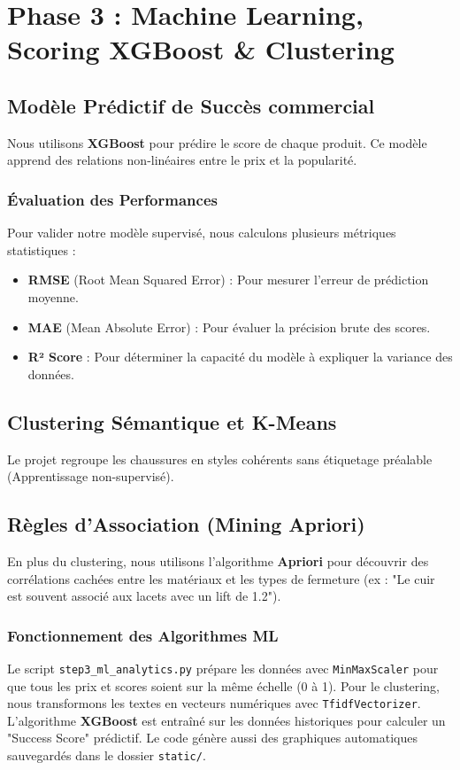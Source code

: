\documentclass[11pt,a4paper,oneside]{report}
\begin{document}
    \chapter{Phase 3 : Machine Learning, Scoring XGBoost \& Clustering}
    \section{Modèle Prédictif de Succès commercial}
    Nous utilisons \textbf{XGBoost} pour prédire le score de chaque produit. Ce modèle apprend des relations non-linéaires entre le prix et la popularité.

    \subsection{Évaluation des Performances}
    Pour valider notre modèle supervisé, nous calculons plusieurs métriques statistiques :
    \begin{itemize}
        \item \textbf{RMSE} (Root Mean Squared Error) : Pour mesurer l'erreur de prédiction moyenne.
        \item \textbf{MAE} (Mean Absolute Error) : Pour évaluer la précision brute des scores.
        \item \textbf{R² Score} : Pour déterminer la capacité du modèle à expliquer la variance des données.
    \end{itemize}

    \section{Clustering Sémantique et K-Means}
    Le projet regroupe les chaussures en styles cohérents sans étiquetage préalable (Apprentissage non-supervisé).

    \section{Règles d'Association (Mining Apriori)}
    En plus du clustering, nous utilisons l'algorithme \textbf{Apriori} pour découvrir des corrélations cachées entre les matériaux et les types de fermeture (ex : "Le cuir est souvent associé aux lacets avec un lift de 1.2").

    \subsection{Fonctionnement des Algorithmes ML}
    Le script \texttt{step3\_ml\_analytics.py} prépare les données avec \texttt{MinMaxScaler} pour que tous les prix et scores soient sur la même échelle (0 à 1). Pour le clustering, nous transformons les textes en vecteurs numériques avec \texttt{TfidfVectorizer}. L'algorithme \textbf{XGBoost} est entraîné sur les données historiques pour calculer un "Success Score" prédictif. Le code génère aussi des graphiques automatiques sauvegardés dans le dossier \texttt{static/}.
\end{document}
